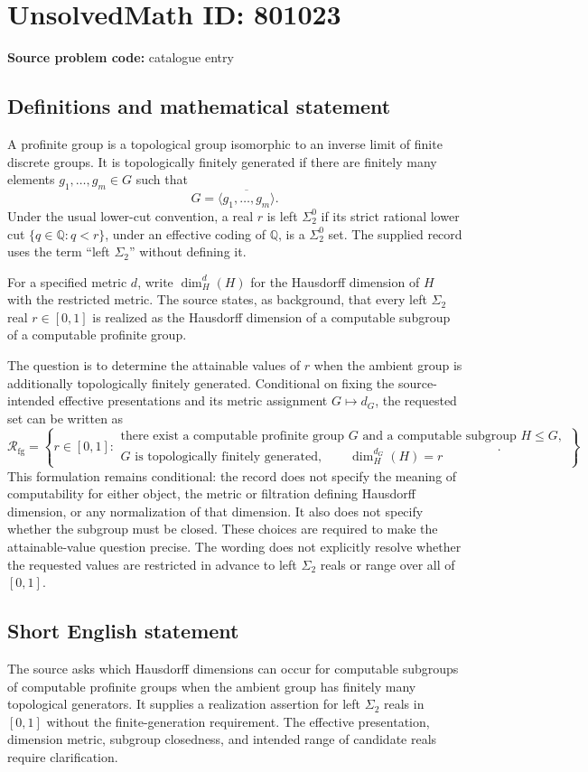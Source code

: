 \documentclass[11pt]{article}
\newcommand{\Q}{\mathbb{Q}}
\begin{document}
\section*{UnsolvedMath ID: 801023}
\textbf{Source problem code:} catalogue entry
\subsection{Definitions and mathematical statement}
A profinite group is a topological group isomorphic to an inverse limit of finite discrete groups. It is topologically finitely generated if there are finitely many elements \(g_1,\ldots,g_m\in G\) such that
\[
G=\overline{\langle g_1,\ldots,g_m\rangle}.
\]
Under the usual lower-cut convention, a real \(r\) is left \(\Sigma^0_2\) if its strict rational lower cut \(\{q\in\Q:q<r\}\), under an effective coding of \(\Q\), is a \(\Sigma^0_2\) set. The supplied record uses the term ``left \(\Sigma_2\)'' without defining it.

For a specified metric \(d\), write \(\dim_H^d(H)\) for the Hausdorff dimension of \(H\) with the restricted metric. The source states, as background, that every left \(\Sigma_2\) real \(r\in[0,1]\) is realized as the Hausdorff dimension of a computable subgroup of a computable profinite group.

The question is to determine the attainable values of \(r\) when the ambient group is additionally topologically finitely generated. Conditional on fixing the source-intended effective presentations and its metric assignment \(G\mapsto d_G\), the requested set can be written as
\[
\mathcal R_{\mathrm{fg}}=
\left\{r\in[0,1]:
\begin{gathered}
\text{there exist a computable profinite group }G\text{ and a computable subgroup }H\leq G,\\
G\text{ is topologically finitely generated},\qquad
\dim_H^{d_G}(H)=r
\end{gathered}
\right\}.
\]
This formulation remains conditional: the record does not specify the meaning of computability for either object, the metric or filtration defining Hausdorff dimension, or any normalization of that dimension. It also does not specify whether the subgroup must be closed. These choices are required to make the attainable-value question precise. The wording does not explicitly resolve whether the requested values are restricted in advance to left \(\Sigma_2\) reals or range over all of \([0,1]\).
\subsection{Short English statement}
The source asks which Hausdorff dimensions can occur for computable subgroups of computable profinite groups when the ambient group has finitely many topological generators. It supplies a realization assertion for left \(\Sigma_2\) reals in \([0,1]\) without the finite-generation requirement. The effective presentation, dimension metric, subgroup closedness, and intended range of candidate reals require clarification.
\end{document}
